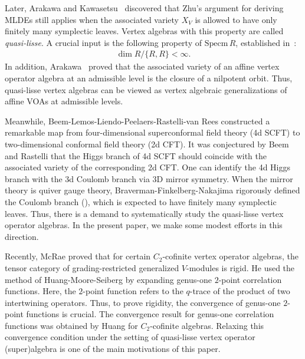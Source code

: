 \documentclass[9pt]{amsart}
\begin{document}
Later, Arakawa and Kawasetsu~\cite{arakawa2018quasi} discovered that Zhu's argument for deriving MLDEs still applies when the associated variety $X_V$ is allowed to have only finitely many symplectic leaves. Vertex algebras with this property are called \emph{quasi-lisse}. A crucial input is the following property of $\mathrm{Specm}\,R$, established in~\cite{etingof2010poisson}:
\begin{align}
    \label{introd1}
    \dim R/\{R, R\} < \infty.
\end{align}
In addition, Arakawa~\cite{arakawa2015associated} proved that the associated variety of an affine vertex operator algebra at an admissible level is the closure of a nilpotent orbit. Thus, quasi-lisse vertex algebras can be viewed as vertex algebraic generalizations of affine VOAs at admissible levels.





Meanwhile, Beem-Lemos-Liendo-Peelaers-Rastelli-van Rees \cite{beem2015infinite} constructed a remarkable map from four-dimensional superconformal field theory (4d SCFT) to two-dimensional conformal field theory (2d CFT). It was conjectured by Beem and Rastelli that the Higgs branch of 4d SCFT should coincide with the associated variety of the corresponding 2d CFT. One can identify the 4d Higgs branch with the 3d Coulomb branch via 3D mirror symmetry. When the mirror theory is quiver gauge theory, Braverman-Finkelberg-Nakajima rigorously defined the Coulomb branch  (\cite{nakajima2015towards,braverman2018towards,braverman1604coulomb}), which is expected to have finitely many symplectic leaves. Thus, there is a demand to systematically study the quasi-lisse vertex operator algebras. In the present paper, we make some modest efforts in this direction.

Recently, McRae \cite{mcrae2021rationality} proved that for certain $C_2$-cofinite vertex operator algebras, the tensor category of grading-restricted generalized $V$-modules is rigid. He used the method of Huang-Moore-Seiberg by expanding genus-one $2$-point correlation functions. Here, the $2$-point function refers to the $q$-trace of the product of two intertwining operators. Thus, to prove rigidity, the convergence of genus-one $2$-point functions is crucial. The convergence result for genus-one correlation functions was obtained by Huang \cite{huang2005differential} for $C_2$-cofinite algebras. Relaxing this convergence condition under the setting of quasi-lisse vertex operator (super)algebra is one of the main motivations of this paper.
\end{document}
